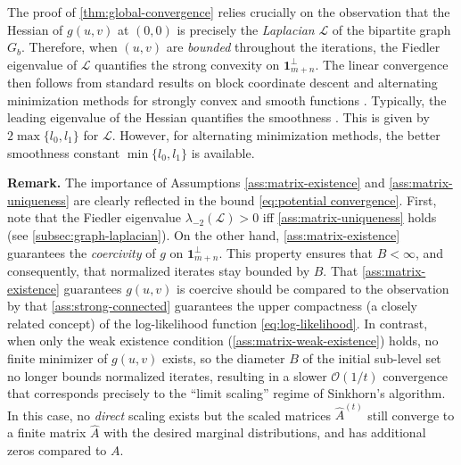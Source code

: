 The proof of \cref{thm:global-convergence} relies crucially on the observation that the Hessian of $g(u,v)$ at $(0,0)$ is precisely the \emph{Laplacian} $\mathcal{L}$ of the bipartite graph $G_b$. Therefore, when $(u,v)$ are \emph{bounded} throughout the iterations, the Fiedler eigenvalue of $\mathcal{L}$ quantifies the strong convexity on $\mathbf{1}_{m+n}^\perp$. The linear convergence then follows from standard results on block coordinate descent and alternating minimization methods for strongly convex and smooth functions \citep{beck2013convergence}. Typically, the leading eigenvalue of the Hessian quantifies the smoothness \citep{luenberger1984linear}. This is given by $2\max\{l_0,l_1\}$ for $\mathcal{L}$. However, for alternating minimization methods, the better smoothness constant $\min\{l_0,l_1\}$ is available. %

\textbf{Remark.}  
The importance of Assumptions \ref{ass:matrix-existence} and \ref{ass:matrix-uniqueness} are clearly reflected in the bound \eqref{eq:potential convergence}.
First, note that the Fiedler eigenvalue $\lambda_{-2}(\mathcal{L})>0$ iff \cref{ass:matrix-uniqueness} holds (see \cref{subsec:graph-laplacian}). On the other hand, \cref{ass:matrix-existence} guarantees the \emph{coercivity} of $g$ on $\mathbf{1}_{m+n}^\perp$. This property ensures that $B<\infty$, and consequently, that normalized iterates stay bounded by $B$. That \cref{ass:matrix-existence} guarantees  $g(u,v)$ is coercive should be compared to the observation by \citet{hunter2004mm} that \cref{ass:strong-connected} guarantees the upper compactness (a closely related concept) of the log-likelihood function \eqref{eq:log-likelihood}.
In contrast, when only the weak existence condition (\cref{ass:matrix-weak-existence}) holds, no finite minimizer of $g(u,v)$ exists, so the diameter $B$ of the initial sub-level set no longer bounds normalized iterates, resulting in a slower $\mathcal O(1/t)$ convergence that corresponds precisely to the ``limit scaling'' regime of Sinkhorn's algorithm. In this case, no \emph{direct} scaling exists but the scaled matrices $\hat A^{(t)}$ still converge to a finite matrix $\hat A$ with the desired marginal distributions, and has additional zeros compared to $A$.

